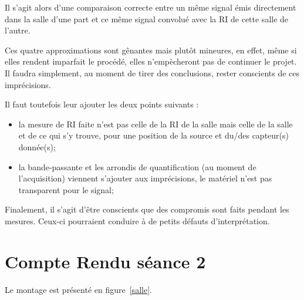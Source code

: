 \documentclass[12pt]{article}
\begin{document}
Il s'agit alors d'une comparaison correcte entre un même signal émis directement dans la salle d'une part et ce même
signal convolué avec la RI de cette salle de l'autre.


Ces quatre approximations sont gênantes mais plutôt mineures, en effet, même si elles rendent imparfait le procédé,
elles n'empècheront pas de continuer le projet. Il faudra simplement, au moment de tirer des conclusions, rester
conscients de ces imprécisions.

Il faut toutefois leur ajouter les deux points suivants :

\begin{itemize}
    \item la mesure de RI faite n'est pas celle de la RI de la salle mais celle de la salle et de ce qui s'y trouve,
    pour une position de la source et du/des capteur(s) donnée(s);
    \item la bande-passante et les arrondis de quantification (au moment de l'acquisition) viennent s'ajouter aux
        imprécisions, le matériel n'est pas transparent pour le signal;
\end{itemize}

Finalement, il s'agit d'être conscients que des compromis sont faits pendant les mesures.
Ceux-ci pourraient conduire à de petits défauts d'interprétation.

\section{Compte Rendu séance 2} %

Le montage est présenté en figure~\ref{salle}.
\end{document}
